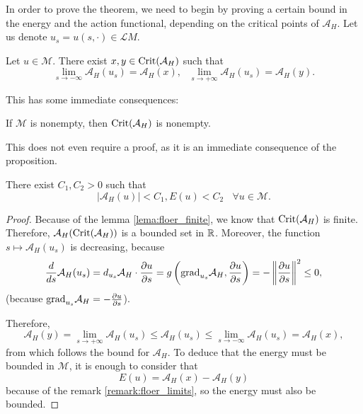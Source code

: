 In order to prove the theorem, we need to begin by proving a certain bound in the energy and the action functional, depending on the critical points of $\mathcal{A}_H$. Let us denote $u_s = u(s,\cdot) \in \mathcal{L}M$.

\begin{prop} \label{prop:floer_action_bound}
Let $u \in \mathcal{M}$. There exist $x,y \in \mathrm{Crit}(\mathcal{A}_H)$ such that
\[\lim_{s \rightarrow -\infty} \mathcal{A}_H(u_s) = \mathcal{A}_H(x), \ \ \ \lim_{s \rightarrow +\infty} \mathcal{A}_H(u_s) = \mathcal{A}_H(y) .\]
\end{prop}

This has some immediate consequences:

\begin{coro}
If $\mathcal{M}$ is nonempty, then $\mathrm{Crit}(\mathcal{A}_H)$ is nonempty.
\end{coro}

This does not even require a proof, as it is an immediate consequence of the proposition.

\begin{coro} \label{coro:floer_energy_bound}
There exist $C_1, C_2 > 0$ such that
\[|\mathcal{A}_H(u)| < C_1 , E(u) < C_2 \ \ \ \ \forall u \in \mathcal{M} .\]
\end{coro}

\begin{proof}
Because of the lemma \ref{lema:floer_finite}, we know that $\mathrm{Crit}(\mathcal{A}_H)$ is finite. Therefore, $\mathcal{A}_H(\mathrm{Crit}(\mathcal{A}_H))$ is a bounded set in $\mathbb{R}$. Moreover, the function $s \mapsto \mathcal{A}_H(u_s)$ is decreasing, because
\[\frac{d}{ds} \mathcal{A}_H(u_s) = d_{u_s} \mathcal{A}_H \cdot \frac{\partial u}{\partial s} = g\left( \mathrm{grad}_{u_s} \mathcal{A}_H, \frac{\partial u}{\partial s} \right) = - \left\|\frac{\partial u}{\partial s}\right\|^2 \leq 0 ,\]
(because $\mathrm{grad}_{u_s}\mathcal{A}_H = - \frac{\partial u}{\partial s}$).

Therefore,
\[\mathcal{A}_H(y) = \lim_{s \rightarrow +\infty} \mathcal{A}_H(u_s) \leq \mathcal{A}_H(u_s) \leq \lim_{s \rightarrow -\infty} \mathcal{A}_H(u_s) = \mathcal{A}_H(x) ,\]
from which follows the bound for $\mathcal{A}_H$. To deduce that the energy must be bounded in $\mathcal{M}$, it is enough to consider that
\[E(u) = \mathcal{A}_H(x) - \mathcal{A}_H(y)\]
because of the remark \ref{remark:floer_limits}, so the energy must also be bounded.
\end{proof}

